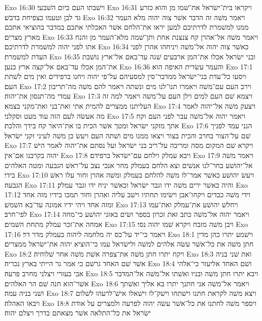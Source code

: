 Exo 16:30  וישׁבתו העם ביום השׁבעי׃
Exo 16:31  ויקראו בית־ישׂראל את־שׁמו מן והוא כזרע גד לבן וטעמו כצפיחת בדבשׁ׃
Exo 16:32  ויאמר משׁה זה הדבר אשׁר צוה יהוה מלא העמר ממנו למשׁמרת לדרתיכם למען יראו את־הלחם אשׁר האכלתי אתכם במדבר בהוציאי אתכם מארץ מצרים׃
Exo 16:33  ויאמר משׁה אל־אהרן קח צנצנת אחת ותן־שׁמה מלא־העמר מן והנח אתו לפני יהוה למשׁמרת לדרתיכם׃
Exo 16:34  כאשׁר צוה יהוה אל־משׁה ויניחהו אהרן לפני העדת למשׁמרת׃
Exo 16:35  ובני ישׂראל אכלו את־המן ארבעים שׁנה עד־באם אל־ארץ נושׁבת את־המן אכלו עד־באם אל־קצה ארץ כנען׃
Exo 16:36  והעמר עשׂרית האיפה הוא׃
Exo 17:1  ויסעו כל־עדת בני־ישׂראל ממדבר־סין למסעיהם על־פי יהוה ויחנו ברפידים ואין מים לשׁתת העם׃
Exo 17:2  וירב העם עם־משׁה ויאמרו תנו־לנו מים ונשׁתה ויאמר להם משׁה מה־תריבון עמדי מה־תנסון את־יהוה׃
Exo 17:3  ויצמא שׁם העם למים וילן העם על־משׁה ויאמר למה זה העליתנו ממצרים להמית אתי ואת־בני ואת־מקני בצמא׃
Exo 17:4  ויצעק משׁה אל־יהוה לאמר מה אעשׂה לעם הזה עוד מעט וסקלני׃
Exo 17:5  ויאמר יהוה אל־משׁה עבר לפני העם וקח אתך מזקני ישׂראל ומטך אשׁר הכית בו את־היאר קח בידך והלכת׃
Exo 17:6  הנני עמד לפניך שׁם על־הצור בחרב והכית בצור ויצאו ממנו מים ושׁתה העם ויעשׂ כן משׁה לעיני זקני ישׂראל׃
Exo 17:7  ויקרא שׁם המקום מסה ומריבה על־ריב בני ישׂראל ועל נסתם את־יהוה לאמר הישׁ יהוה בקרבנו אם־אין׃
Exo 17:8  ויבא עמלק וילחם עם־ישׂראל ברפידם׃
Exo 17:9  ויאמר משׁה אל־יהושׁע בחר־לנו אנשׁים וצא הלחם בעמלק מחר אנכי נצב על־ראשׁ הגבעה ומטה האלהים בידי׃
Exo 17:10  ויעשׂ יהושׁע כאשׁר אמר־לו משׁה להלחם בעמלק ומשׁה אהרן וחור עלו ראשׁ הגבעה׃
Exo 17:11  והיה כאשׁר ירים משׁה ידו וגבר ישׂראל וכאשׁר יניח ידו וגבר עמלק׃
Exo 17:12  וידי משׁה כבדים ויקחו־אבן וישׂימו תחתיו וישׁב עליה ואהרן וחור תמכו בידיו מזה אחד ומזה אחד ויהי ידיו אמונה עד־בא השׁמשׁ׃
Exo 17:13  ויחלשׁ יהושׁע את־עמלק ואת־עמו לפי־חרב׃
Exo 17:14  ויאמר יהוה אל־משׁה כתב זאת זכרון בספר ושׂים באזני יהושׁע כי־מחה אמחה את־זכר עמלק מתחת השׁמים׃
Exo 17:15  ויבן משׁה מזבח ויקרא שׁמו יהוה נסי׃
Exo 17:16  ויאמר כי־יד על־כס יה מלחמה ליהוה בעמלק מדר דר׃
Exo 18:1  וישׁמע יתרו כהן מדין חתן משׁה את כל־אשׁר עשׂה אלהים למשׁה ולישׂראל עמו כי־הוציא יהוה את־ישׂראל ממצרים׃
Exo 18:2  ויקח יתרו חתן משׁה את־צפרה אשׁת משׁה אחר שׁלוחיה׃
Exo 18:3  ואת שׁני בניה אשׁר שׁם האחד גרשׁם כי אמר גר הייתי בארץ נכריה׃
Exo 18:4  ושׁם האחד אליעזר כי־אלהי אבי בעזרי ויצלני מחרב פרעה׃
Exo 18:5  ויבא יתרו חתן משׁה ובניו ואשׁתו אל־משׁה אל־המדבר אשׁר־הוא חנה שׁם הר האלהים׃
Exo 18:6  ויאמר אל־משׁה אני חתנך יתרו בא אליך ואשׁתך ושׁני בניה עמה׃
Exo 18:7  ויצא משׁה לקראת חתנו וישׁתחו וישׁק־לו וישׁאלו אישׁ־לרעהו לשׁלום ויבאו האהלה׃
Exo 18:8  ויספר משׁה לחתנו את כל־אשׁר עשׂה יהוה לפרעה ולמצרים על אודת ישׂראל את כל־התלאה אשׁר מצאתם בדרך ויצלם יהוה׃
